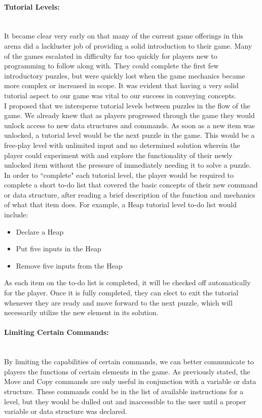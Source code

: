 \paragraph{Tutorial Levels:} ~\\
It became clear very early on that many of the current game offerings in this arena did a lackluster job of
providing a solid introduction to their game. Many of the games escalated in difficulty far too quickly for
players new to programming to follow along with. They could complete the first few introductory puzzles,
but were quickly lost when the game mechanics became more complex or increased in scope. It was evident
that having a very solid tutorial aspect to our game was vital to our success in conveying concepts.\\

I proposed that we intersperse tutorial levels between puzzles in the flow of the game. We already knew that
as players progressed through the game they would unlock access to new data structures and commands. As
soon as a new item was unlocked, a tutorial level would be the next puzzle in the game. This would be a free-play
level with unlimited input and no determined solution wherein the player could experiment with and explore
the functionality of their newly unlocked item without the pressure of immediately needing it to solve a puzzle.\\

In order to ``complete" each tutorial level, the player would be required to complete a short to-do list that
covered the basic concepts of their new command or data structure, after reading a brief description of the function
and mechanics of what that item does. For example, a Heap tutorial level to-do list would include:
\begin{itemize}
	\item Declare a Heap
	\item Put five inputs in the Heap
	\item Remove five inputs from the Heap
\end{itemize}
As each item on the to-do list is completed, it will be checked off automatically for the player. Once it is fully
completed, they can elect to exit the tutorial whenever they are ready and move forward to the next
puzzle, which will necessarily utilize the new element in its solution. \\

\paragraph{Limiting Certain Commands:} ~\\
By limiting the capabilities of certain commands, we can better communicate to players the functions of certain
elements in the game. As previously stated, the Move and Copy commands are only useful in conjunction with a
variable or data structure. These commands could be in the list of available instructions for a level, but they would be
dulled out and inaccessible to the user until a proper variable or data structure was declared.\\

